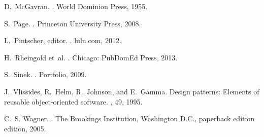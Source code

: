 \documentclass{acm_proc_article-sp}
\begin{document}
\begin{thebibliography}{10}
D.~McGavran.
.
\newblock World Dominion Press, 1955.

S.~Page.
.
\newblock Princeton University Press, 2008.

L.~Pintscher, editor.
.
\newblock lulu.com, 2012.

H.~Rheingold et~al.
.
\newblock Chicago: PubDomEd Press, 2013.

S.~Sinek.
.
\newblock Portfolio, 2009.

J.~Vlissides, R.~Helm, R.~Johnson, and E.~Gamma.
\newblock Design patterns: Elements of reusable object-oriented software.
, 49, 1995.

C.~S. Wagner.
.
\newblock The Brookings Institution, Washington D.C., paperback edition
  edition, 2005.

\end{thebibliography}

\balancecolumns
\end{document}
